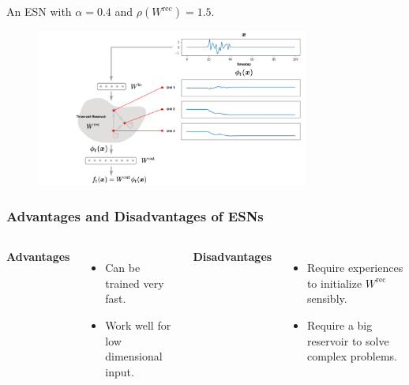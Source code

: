 \documentclass[Nike]{tuberlinbeamer}
\begin{document}
\begin{frame}
{			An ESN with $\alpha=0.4$ and $\rho(W^{\text{rec}}) = 1.5$.
			\vspace*{\fill}
			 \begin{figure}[h]
				\includegraphics [width=0.8\textwidth]{figures/esn_toyexample_improperly_normalized_wrec}
			\end{figure}
			\vspace*{\fill}
	}
		    

\end{frame}

\begin{frame}
	\frametitle{Advantages and Disadvantages of ESNs}
	\begin{columns}
		\textbf{Advantages}
					 \begin{itemize}
					 	\item Can be trained very fast.
					 	\item Work well for low dimensional input.
					 \end{itemize}

					 \textbf{Disadvantages}
				 \begin{itemize}
				 	\item Require experiences to initialize $W^{\text{rec}}$ sensibly.
				 	\item Require a big reservoir to solve complex problems.
				 \end{itemize}	

	\end{columns}				
\end{frame}
\end{document}
